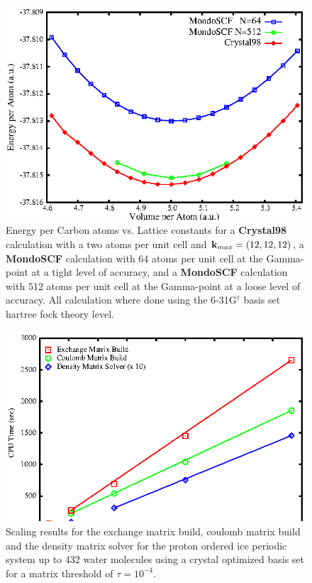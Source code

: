 \documentclass[prb,aps,nobibnotes,twocolumn,doublespace,twocolumngrid,superbib]{revtex4}
\begin{document}
%
%
%
\begin{figure}
\caption{Energy per Carbon atoms vs. Lattice constants for a {\bf Crystal98} calculation 
with a two atoms per unit
cell and ${\bf k}_{max} = (12,12,12)$, a {\bf MondoSCF} calculation with 64 atoms per
unit cell at the Gamma-point at a tight level of accuracy, and a {\bf MondoSCF} calculation 
with 512 atoms  per
unit cell at the Gamma-point at a loose level of accuracy.
All calculation where done using the 
6-31G$ ^\dagger$ basis set hartree fock theory level. }
\label{figure:EnergyVsLattice}
{\centering \includegraphics{Diamond_En_vs_V.ps} \par} 
\end{figure}
%
%
%
\begin{figure}
\caption{Scaling results for the exchange matrix build, coulomb matrix
build and the density matrix solver  for the proton ordered ice periodic system up to 432 water molecules 
using a crystal optimized basis set\cite{CBS:511G:H,CBS:861G:MgO} for a matrix threshold of $\tau=10^{-4}$.}
\label{figure:Scaling_Matrix_Build_Ice}
{\centering \includegraphics{Timing_pIce_ONX_1.ps} \par} 
\end{figure}
\end{document}
